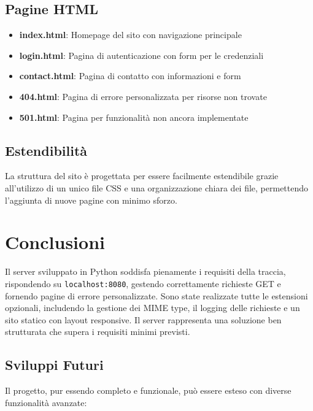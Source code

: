 \documentclass[a4paper,12pt]{report}
\begin{document}
\section{Pagine HTML}

\begin{itemize}
    \item \textbf{index.html}: Homepage del sito con navigazione principale
    \item \textbf{login.html}: Pagina di autenticazione con form per le credenziali
    \item \textbf{contact.html}: Pagina di contatto con informazioni e form
    \item \textbf{404.html}: Pagina di errore personalizzata per risorse non trovate
    \item \textbf{501.html}: Pagina per funzionalità non ancora implementate
\end{itemize}

\section{Estendibilità}

La struttura del sito è progettata per essere facilmente estendibile grazie all'utilizzo di un unico file CSS e una organizzazione chiara dei file, permettendo l'aggiunta di nuove pagine con minimo sforzo.

\chapter{Conclusioni}

Il server sviluppato in Python soddisfa pienamente i requisiti della traccia, rispondendo su \texttt{localhost:8080}, gestendo correttamente richieste GET e fornendo pagine di errore personalizzate. 
Sono state realizzate tutte le estensioni opzionali, includendo la gestione dei MIME type, il logging delle richieste e un sito statico con layout responsive. 
Il server rappresenta una soluzione ben strutturata che supera i requisiti minimi previsti.

\section{Sviluppi Futuri}

Il progetto, pur essendo completo e funzionale, può essere esteso con diverse funzionalità avanzate:
\end{document}

